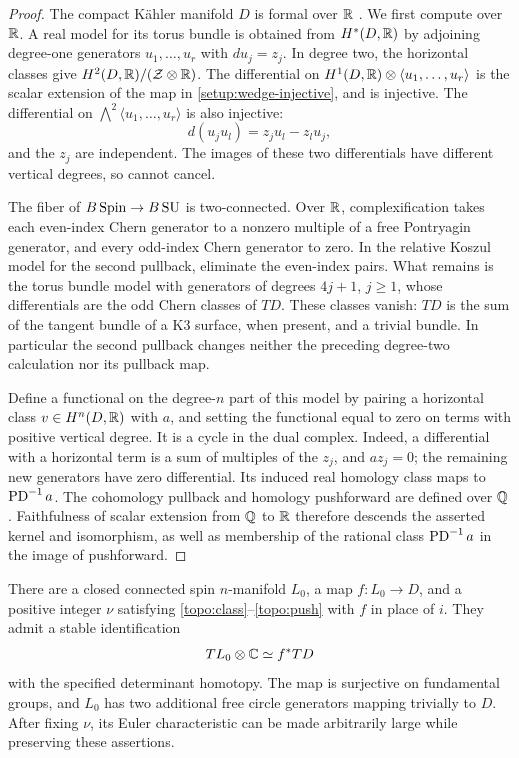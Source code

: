 \begin{proof}
The compact K\"ahler manifold $D$ is formal over $\mathbb R$
\cite{DeligneGriffithsMorganSullivan}.  We first compute over $\mathbb R$.
A real model for its torus bundle is obtained from $H^*(D,\mathbb R)$
by adjoining degree-one
generators $u_1,\ldots,u_r$ with $du_j=z_j$.  In degree two, the
horizontal classes give $H^2(D,\mathbb R)/(\mathcal Z\otimes\mathbb R)$.
The differential on
$H^1(D,\mathbb R)\otimes\langle u_1,\ldots,u_r\rangle$ is the scalar
extension of the map in \eqref{setup:wedge-injective}, and is
injective.  The differential
on $\bigwedge^2\langle u_1,\ldots,u_r\rangle$ is also injective:
\[
 d(u_j u_l)=z_j u_l-z_l u_j,
\]
and the $z_j$ are independent.  The images of these two differentials
have different vertical degrees, so cannot cancel.

The fiber of $B\operatorname{Spin}\to B\operatorname{SU}$ is two-connected.  Over $\mathbb R$,
complexification takes each even-index Chern generator to a nonzero
multiple of a free Pontryagin generator, and every odd-index Chern
generator to zero.  In the relative Koszul model for the second
pullback, eliminate the even-index pairs.  What remains is the torus
bundle model with generators of degrees $4j+1$, $j\geq1$, whose
differentials are the odd Chern classes of $TD$.  These classes vanish:
$TD$ is the sum of the tangent bundle of a K3 surface, when present,
and a trivial bundle.  In particular the second pullback changes
neither the preceding degree-two calculation nor its pullback map.

Define a functional on the degree-$n$ part of this model by pairing
a horizontal class $v\in H^n(D,\mathbb R)$ with $a$, and setting the
functional equal to zero on terms with positive vertical degree.
It is a cycle in the dual complex.  Indeed, a differential with a
horizontal term is a sum of multiples of the $z_j$, and
$a z_j=0$; the remaining new generators have zero differential.
Its induced real homology class maps to $\operatorname{PD}^{-1}a$.
The cohomology pullback and homology pushforward are defined over
$\mathbb Q$.  Faithfulness of scalar extension from $\mathbb Q$ to $\mathbb R$ therefore
descends the asserted kernel and isomorphism, as well as membership
of the rational class $\operatorname{PD}^{-1}a$ in the image of pushforward.
\end{proof}

\begin{lemma}\label{topo:source}
There are a closed connected spin $n$-manifold $L_0$, a map
$f:L_0\to D$, and a positive integer $\nu$ satisfying
\eqref{topo:class}--\eqref{topo:push} with $f$ in place of $i$.
They admit a stable identification
\begin{equation}\label{topo:stable}
 TL_0\otimes\mathbb C\simeq f^*TD
\end{equation}
with the specified determinant homotopy.  The map is surjective on
fundamental groups, and $L_0$ has two additional free circle generators
mapping trivially to $D$.  After fixing $\nu$, its Euler characteristic
can be made arbitrarily large while preserving these assertions.
\end{lemma}

